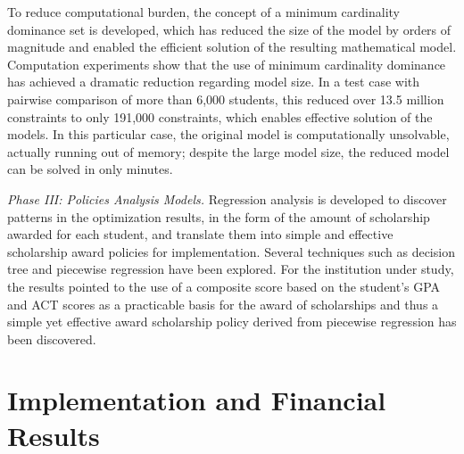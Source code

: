 \documentclass[12pt,english]{report}
\begin{document}
To reduce computational burden, the concept of a minimum cardinality dominance set is developed, which has reduced the size of the model by orders of magnitude and enabled the efficient solution of the resulting mathematical model. Computation experiments show that the use of minimum cardinality dominance has achieved a dramatic reduction regarding model size. In a test case with pairwise comparison of more than 6,000 students, this reduced over 13.5 million constraints to only 191,000 constraints, which enables effective solution of the models.   In this particular case,  the original model is computationally unsolvable, actually running out of memory; despite the large model size, the reduced model can be solved in only minutes.
% 
% 

\noindent \textit{Phase III: Policies Analysis Models.} Regression analysis is developed to discover patterns in the optimization results, in the form of the amount of scholarship awarded for each student, and translate them into simple and effective scholarship award policies for implementation. Several techniques such as decision tree and piecewise regression  have been explored. For the institution under study, the results pointed to the use of a composite score based on the student's GPA and ACT scores as a practicable basis for the award of scholarships and thus a simple  yet effective award scholarship policy derived from piecewise regression has been discovered.
% 
% 
% 
% 

\section{Implementation and Financial Results}
\end{document}
